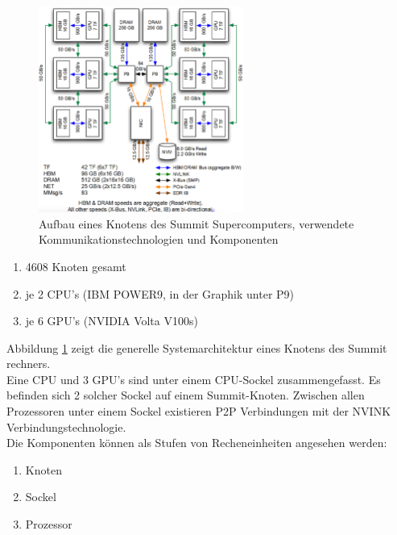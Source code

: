 \begin{figure}
\centering
\includegraphics[width=0.6\textwidth]{res/architecture.png}
\caption{\cite[Abb. 1]{mainpaper} Aufbau eines Knotens des Summit Supercomputers, verwendete Kommunikationstechnologien und Komponenten}
	\label{fig:architecture}
\end{figure}
\begin{enumerate}
	\item 4608 Knoten gesamt
	\item je 2 CPU's (IBM POWER9, in der Graphik unter P9)
	\item je 6 GPU's (NVIDIA Volta V100s)
\end{enumerate} \cite{osummit}
Abbildung \ref{fig:architecture} zeigt die generelle Systemarchitektur eines Knotens des Summit rechners.\\
Eine CPU und 3 GPU's sind unter einem CPU-Sockel zusammengefasst. Es befinden sich 2 solcher Sockel auf einem Summit-Knoten. Zwischen allen Prozessoren unter einem Sockel existieren P2P Verbindungen mit der NVINK Verbindungstechnologie.\\
Die Komponenten können als Stufen von Recheneinheiten angesehen werden:
\begin{enumerate}
	\item Knoten
	\item Sockel
	\item Prozessor
\end{enumerate}

